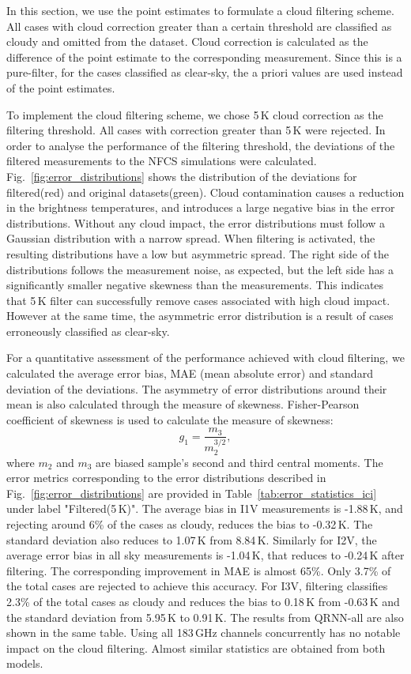\documentclass[amt, manuscript]{copernicus}
\begin{document}
In this section, we use the point estimates to formulate a cloud filtering scheme. All cases with  cloud correction greater than a certain threshold are classified as cloudy and omitted from the dataset. Cloud correction is calculated as the difference of the point estimate to the corresponding measurement. Since this is a pure-filter, for the cases classified as clear-sky, the a priori values are used instead of the point estimates. 

To implement the cloud filtering scheme, we chose 5\,K cloud correction as the filtering threshold. All cases with correction greater than 5\,K were rejected. In order to analyse the performance of the filtering threshold, the deviations of the filtered measurements to the NFCS simulations were calculated. Fig.~\ref{fig:error_distributions} shows the distribution of the deviations for filtered(red) and original datasets(green). Cloud contamination causes a reduction in the brightness temperatures, and introduces a large negative bias in the error distributions. Without any cloud impact, the error distributions must follow a Gaussian distribution with a narrow spread. When filtering is activated, the resulting distributions have a low but asymmetric spread. The right side of the distributions follows the measurement noise, as expected, but the left side has a significantly smaller negative skewness than the measurements. This indicates that 5\,K filter can successfully remove cases associated with high cloud impact. However at the same time, the asymmetric error distribution is a result of cases erroneously classified as clear-sky. 

For a quantitative assessment of the performance achieved with cloud filtering, we calculated the average error bias, MAE (mean absolute error) and standard deviation of the deviations. The asymmetry of error distributions around their mean is also calculated through the measure of skewness. Fisher-Pearson coefficient of skewness is used to calculate the measure of skewness: 
\begin{equation}
g_1 = \frac{m_3}{m_2^{3/2}}, 
\end{equation}
where $m_2$ and $m_3$ are biased sample's second and third central moments. The error metrics corresponding to the error distributions described in Fig.~\ref{fig:error_distributions} are provided in Table~\ref{tab:error_statistics_ici} under label "Filtered(5\,K)". The average bias in I1V measurements is -1.88\,K, and rejecting around 6\% of the cases as cloudy, reduces the bias to -0.32\,K. The standard deviation also reduces to 1.07\,K from 8.84\,K. Similarly for I2V, the average error bias in all sky measurements is -1.04\,K, that reduces to -0.24\,K after filtering. The corresponding improvement in MAE is almost 65\%. Only 3.7\% of the total cases are rejected to achieve this accuracy. For I3V, filtering classifies 2.3\% of the total cases as cloudy and reduces the bias to 0.18\,K from -0.63\,K and the standard deviation from 5.95\,K to 0.91\,K. The results from QRNN-all are also shown in the same table. Using all 183\,GHz channels concurrently has no notable impact on the cloud filtering. Almost similar statistics are obtained from both models.
\end{document}
